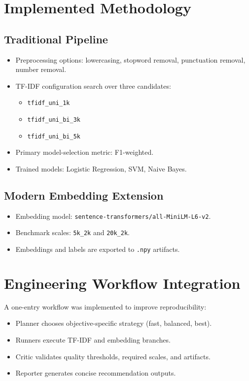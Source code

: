 \documentclass[a4paper,12pt]{article}
\begin{document}
\section{Implemented Methodology}
\subsection{Traditional Pipeline}
\begin{itemize}[leftmargin=*]
    \item Preprocessing options: lowercasing, stopword removal, punctuation removal, number removal.
    \item TF-IDF configuration search over three candidates:
    \begin{itemize}
        \item \texttt{tfidf\_uni\_1k}
        \item \texttt{tfidf\_uni\_bi\_3k}
        \item \texttt{tfidf\_uni\_bi\_5k}
    \end{itemize}
    \item Primary model-selection metric: F1-weighted.
    \item Trained models: Logistic Regression, SVM, Naive Bayes.
\end{itemize}

\subsection{Modern Embedding Extension}
\begin{itemize}[leftmargin=*]
    \item Embedding model: \texttt{sentence-transformers/all-MiniLM-L6-v2}.
    \item Benchmark scales: \texttt{5k\_2k} and \texttt{20k\_2k}.
    \item Embeddings and labels are exported to \texttt{.npy} artifacts.
\end{itemize}

\section{Engineering Workflow Integration}
A one-entry workflow was implemented to improve reproducibility:
\begin{itemize}[leftmargin=*]
    \item Planner chooses objective-specific strategy (fast, balanced, best).
    \item Runners execute TF-IDF and embedding branches.
    \item Critic validates quality thresholds, required scales, and artifacts.
    \item Reporter generates concise recommendation outputs.
\end{itemize}
\end{document}
